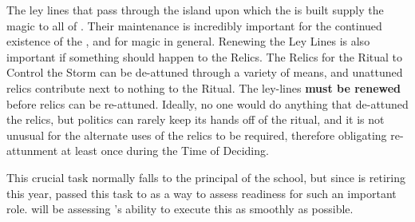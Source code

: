 \documentclass[green]{GL2020}
\begin{document}
\name{\gLeyLines{}}

The ley lines that pass through the island upon which the \pSchool{} is built supply the magic to all of \pEarth{}. Their maintenance is incredibly important for the continued existence of the \pSc{}, and for magic in general. Renewing the Ley Lines is also important if something should happen to the Relics. The Relics for the Ritual to Control the Storm can be de-attuned through a variety of means, and unattuned relics contribute next to nothing to the Ritual. The ley-lines \textbf{must be renewed} before relics can be re-attuned. Ideally, no one would do anything that de-attuned the relics, but politics can rarely keep its hands off of the ritual, and it is not unusual for the alternate uses of the relics to be required, therefore obligating re-attunment at least once during the Time of Deciding.

This crucial task normally falls to the principal of the school, but since \cPrincipal{\full} is retiring this year, \cPrincipal{\they} \cPrincipal{\have} passed this task to \cBeetle{} as a way to assess \cBeetle{\their} readiness for such an important role. \cPrincipal{} will be assessing \cBeetle{}’s ability to execute this as smoothly as possible.
\end{document}

